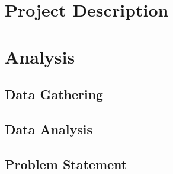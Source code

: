 \part*{Project Description}



\part{Analysis}

% 
% 
% 
% 
% 
% 
% 
% 


\chapter{Data Gathering}\label{cha:DG}







\chapter{Data Analysis}\label{cha:DA}




\chapter{Problem Statement}


